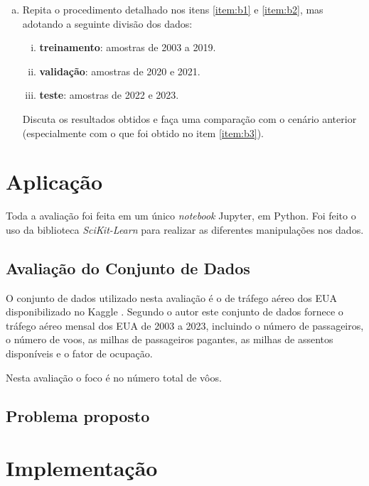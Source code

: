 \documentclass[final,5p]{elsarticle}
\numberwithin{equation}{section}
\begin{document}
\begin{enumerate}[(a)]
        \item Repita o procedimento detalhado nos itens \ref{item:b1} e \ref{item:b2}, mas adotando a seguinte divisão dos dados:

        \begin{enumerate}[(i)]
            \item \textbf{treinamento}: amostras de 2003 a 2019.
            \item \textbf{validação}: amostras de 2020 e 2021.
            \item \textbf{teste}: amostras de 2022 e 2023.
        \end{enumerate}

        Discuta os resultados obtidos e faça uma comparação com o cenário anterior (especialmente
        com o que foi obtido no item \ref{item:b3}).
    \end{enumerate}

\section{Aplicação}

    Toda a avaliação foi feita em um único \emph{notebook} Jupyter, em Python. Foi feito o uso da biblioteca \emph{SciKit-Learn} \cite{scikit-learn} para realizar as diferentes manipulações nos dados.

    \subsection{Avaliação do Conjunto de Dados}

    O conjunto de dados utilizado nesta avaliação é o de tráfego aéreo dos EUA disponibilizado no Kaggle \cite{YYXian_2024}. Segundo o autor este conjunto de dados fornece o tráfego aéreo mensal dos EUA de 2003 a 2023, incluindo o número de passageiros, o número de voos, as milhas de passageiros pagantes, as milhas de assentos disponíveis e o fator de ocupação.

    Nesta avaliação o foco é no número total de vôos.







    \subsection{Problema proposto}


    \section{Implementação}
\end{document}
